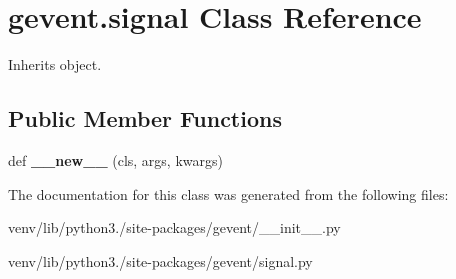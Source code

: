 \hypertarget{classgevent_1_1signal}{}\section{gevent.\+signal Class Reference}
\label{classgevent_1_1signal}


Inherits object.

\subsection*{Public Member Functions}
\begin{DoxyCompactItemize}
\item 
\mbox{\label{classgevent_1_1signal_a6bb46dc5770a189af33dcdda4b9774cc}} 
def {\bfseries \+\_\+\+\_\+new\+\_\+\+\_\+} (cls, args, kwargs)
\end{DoxyCompactItemize}


The documentation for this class was generated from the following files\+:\begin{DoxyCompactItemize}
\item 
venv/lib/python3./site-\/packages/gevent/\+\_\+\+\_\+init\+\_\+\+\_\+.\+py\item 
venv/lib/python3./site-\/packages/gevent/signal.\+py\end{DoxyCompactItemize}
